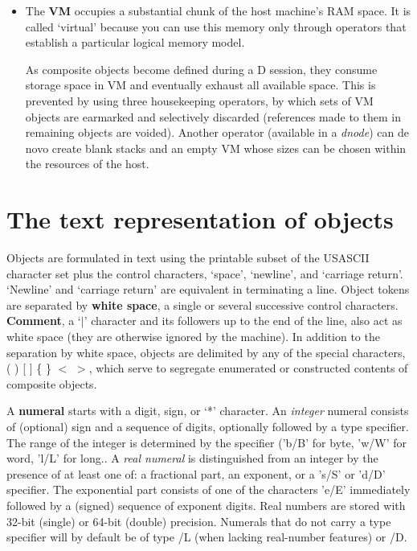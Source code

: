 \begin{itemize}
\item The \textbf{VM} occupies a substantial chunk of the host machine's RAM space.  It is  called  `virtual'  because  you can  use  this  memory  only  through operators that establish a particular logical memory model.

As composite objects become defined during a D  session,  they consume  storage space in VM and eventually exhaust all available  space. This is prevented by using three housekeeping operators, by which sets of VM objects are earmarked and selectively discarded (references made to them in remaining objects are voided). Another operator (available in a \emph{dnode}) can de novo create blank stacks and an empty VM whose sizes can be chosen within the resources of the host.
\end{itemize} 

\section{The text representation of objects}

Objects are formulated in text using the printable subset of the USASCII character set  plus  the control characters,  `space', `newline', and `carriage return'. `Newline' and `carriage return' are equivalent in terminating a line. Object  tokens  are  separated  by \textbf{white  space},  a  single  or  several successive control characters. \textbf{Comment}, a `$|$' character and its followers up  to the end of the line, also act as white space (they  are  otherwise ignored by the machine).  In  addition  to the separation by white  space,  objects  are  delimited by any of the special characters,  ( ) [ ] \{ \} $<$ $>$, which serve to segregate enumerated or constructed contents of composite objects.

A \textbf{numeral}  starts  with  a  digit,   sign,   or  `*'   character.   An \emph{integer} numeral consists of (optional)  sign  and a sequence  of  digits, optionally  followed  by a type specifier.  The range of the  integer  is determined by the specifier ('b/B' for byte,  'w/W' for word,  'l/L'  for long.. A \emph{real numeral} is distinguished from an integer  by  the  presence  of at least one  of:  a  fractional  part,  an exponent,  or a 's/S' or 'd/D'  specifier.  The exponential part consists of one  of the  characters  'e/E'  immediately followed by a  (signed)  sequence  of exponent   digits.   Real  numbers are  stored  with  32-bit   (single) or 64-bit (double) precision. Numerals that do not carry a type specifier will by default be of type /L (when lacking real-number features) or /D.

